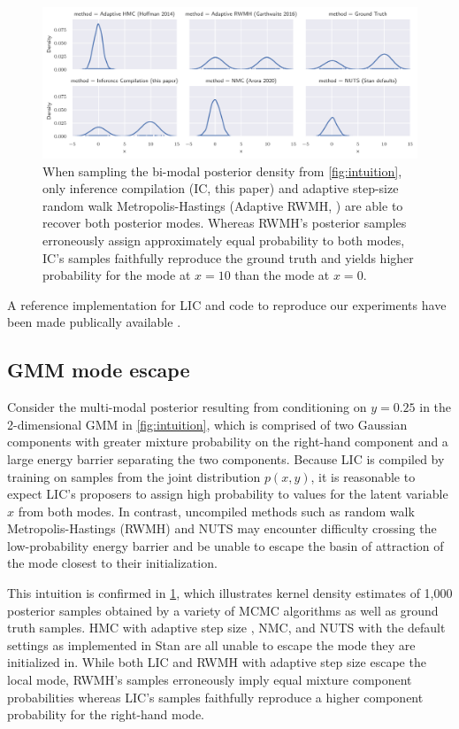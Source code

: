 \documentclass[thesis.tex]{subfiles}
\begin{document}
\begin{figure}
  \includegraphics[width=\linewidth]{Figures/mode_escape.pdf}
  \caption{
    When sampling the bi-modal posterior density from \cref{fig:intuition},
    only inference compilation (IC, this paper) and adaptive step-size random walk
    Metropolis-Hastings (Adaptive RWMH, \cite{garthwaite2016adaptive}) are
    able to recover both posterior modes. Whereas RWMH's posterior samples
    erroneously assign approximately equal probability to both modes,
    IC's samples faithfully reproduce the ground truth and yields
    higher probability for the mode at $x=10$ than the mode at $x=0$.
  }\label{fig:gmm_mode_escape}
\end{figure}

A reference implementation for LIC and code to reproduce our experiments
have been made publically available \citep{lic2020}.

\subsection{GMM mode escape}
\label{ssec:gmm}

Consider the multi-modal posterior resulting from conditioning on $y=0.25$ in
the 2-dimensional GMM in \cref{fig:intuition}, which is comprised of two
Gaussian components with greater mixture probability on the right-hand
component and a large energy barrier separating the two components. Because
LIC is compiled by training on samples from the joint distribution $p(x, y)$,
it is reasonable to expect LIC's proposers to assign high probability to
values for the latent variable $x$ from both modes. In contrast, uncompiled
methods such as random walk Metropolis-Hastings (RWMH) and NUTS may encounter
difficulty crossing the low-probability energy barrier and be unable to escape
the basin of attraction of the mode closest to their initialization.

This intuition is confirmed in \cref{fig:gmm_mode_escape}, which illustrates
kernel density estimates of 1,000 posterior samples obtained by a variety of
MCMC algorithms as well as ground truth samples. HMC with adaptive step size
\citep{hoffman2014no}, NMC, and NUTS with the default settings as implemented
in Stan \citep{carpenter2017stan} are all unable to escape the mode they are
initialized in. While both LIC and RWMH with adaptive step size escape the
local mode, RWMH's samples erroneously imply equal mixture component
probabilities whereas LIC's samples faithfully reproduce a higher component
probability for the right-hand mode.
\end{document}
